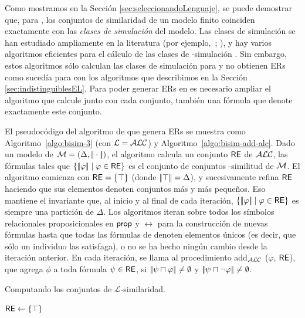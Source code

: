 Como mostramos en la Secci\'on \ref{sec:seleccionandoLenguaje}, se puede demostrar que, para \ALC, los conjuntos de similaridad de un modelo finito
coinciden exactamente con las \emph{clases de simulaci\'on} del modelo. Las
clases de simulaci\'on se han estudiado ampliamente en la literatura
(por ejemplo,~\cite{BRV01}; \cite {Kurt:expr99}), y hay varios
algoritmos eficientes para el c\'alculo de las clases de \alc-simulaci\'on
\cite{hopc:algo71,paig:thre87,dovier04:_effic_algor_for_comput_bisim_equiv}.
Sin embargo, estos algoritmos s\'olo calculan las clases de simulaci\'on para \alc y no obtienen ERs como suced\'ia para \EL con los algoritmos que describimos en la Secci\'on \ref{sec:indistinguiblesEL}. Para poder generar ERs en \alc es necesario ampliar el algoritmo \cite{hopc:algo71} que
calcule junto con cada conjunto, tambi\'en una f\'ormula que denote
exactamente este conjunto.
 
El pseudoc\'odigo del algoritmo de \ALC que genera ERs se muestra como
Algoritmo~\ref{algo:bisim-3} (con $\mathcal{L}=\mathcal{ALC}$) y
Algoritmo~\ref{algo:bisim-add-alc}. Dado un modelo de $\mathcal{M}=(\Delta,
|\!|\cdot|\!|)$, el algoritmo calcula un conjunto $\textsf{RE}$ de $\mathcal{ALC}$, las
f\'ormulas tales que $ \{|\!|\varphi|\!| \mid \varphi \in \textsf{RE} \} $ es el
conjunto de conjuntos \alc-similitud de $\mathcal{M}$. El algoritmo comienza con $ \textsf{RE}
= \{\top \} $ (donde $ |\!|\top|\!| = \Delta $), y sucesivamente refina
$\textsf{RE}$ haciendo que sus elementos denoten conjuntos m\'as y m\'as peque\~nos. Eso
mantiene el invariante que, al inicio y al final de cada iteraci\'on,
$\{|\!|\varphi|\!| \mid \varphi \in \textsf{RE}\}$ es siempre una partici\'on de
$ \Delta $. Los algoritmos iteran sobre todos los
s\'imbolos relacionales proposicionales en $ \mathsf{prop} $ y $\rel $ para la construcci\'on de nuevas f\'ormulas
hasta que todas las f\'ormulas de \RE denoten elementos \'unicos (es decir, que
s\'olo un individuo las satisfaga), o no se ha hecho ning\'un cambio desde la
 iteraci\'on anterior. En cada iteraci\'on, se llama al procedimiento
add$_\mathcal{ALC}$ ($ \varphi $, $\textsf{RE}$), que agrega $ \phi $ a toda
f\'ormula $\psi \in \textsf{RE} $, 
si $|\!|\psi \sqcap \varphi|\!| \not = \emptyset$ y $|\!|\psi \sqcap \neg \varphi|\!| \not = \emptyset$.

\begin{megaalgorithm}[H]%
\dontprintsemicolon

\caption{Computando los conjuntos de $\mathcal{L}$-similaridad.}
\label{algo:bisim-3}

$\textsf{RE} \leftarrow \{\top\}$


\end{megaalgorithm}

